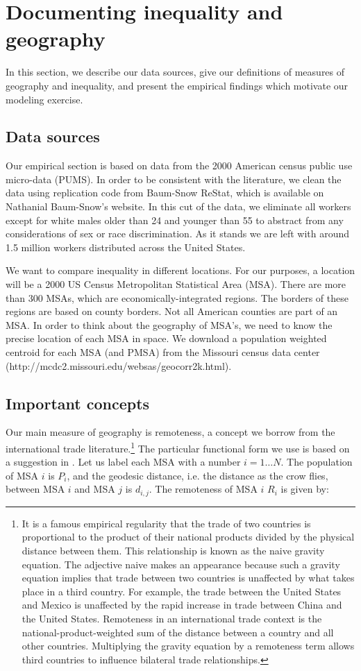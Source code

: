 \documentclass{article}
\begin{document}
\section{Documenting inequality and geography}

In this section, we describe our data sources, give our definitions of measures of geography and inequality, and present the empirical findings which motivate our modeling exercise.  
\subsection{Data sources}

Our empirical section is based on data from the 2000 American census public use micro-data (PUMS).  In order to be consistent with the literature, we clean the data using replication code from Baum-Snow ReStat, which is available on Nathanial Baum-Snow's website.  In this cut of the data, we eliminate all workers except for white males older than 24 and younger than 55 to abstract from any considerations of sex or race discrimination.  As it stands we are left with around 1.5 million workers distributed across the United States.

We want to compare inequality in different locations.  For our purposes, a location will be a 2000 US Census Metropolitan Statistical Area (MSA).  There are more than 300 MSAs, which are economically-integrated regions.  The borders of these regions are based on county borders.  Not all American counties are part of an MSA.  In order to think about the geography of MSA's, we need to know the precise location of each MSA in space.  We download a population weighted centroid for each MSA (and PMSA) from the Missouri census data center (http://mcdc2.missouri.edu/websas/geocorr2k.html).

\subsection{Important concepts}

Our main measure of geography is remoteness, a concept we borrow from the international trade literature.\footnote{It is a famous empirical regularity that the trade of two countries is proportional to the product of their national products divided by the physical distance between them.  This relationship is known as the naive gravity equation.  The adjective naive makes an appearance because such a gravity equation implies that trade between two countries is unaffected by what takes place in a third country.  For example, the trade between the United States and Mexico is unaffected by the rapid increase in trade between China and the United States.  Remoteness in an international trade context is the national-product-weighted sum of the distance between a country and all other countries.  Multiplying the gravity equation by a remoteness term allows third countries to influence bilateral trade relationships.}  The particular functional form we use is based on a suggestion in \citet{head2003gravity}.  Let us label each MSA with a number $i=1\dots N$.  The population of MSA $i$ is $P_i$, and the geodesic distance, i.e. the distance as the crow flies, between MSA $i$ and MSA $j$ is $d_{i,j}$.  The remoteness of MSA $i$ $R_i$ is given by:
\end{document}
